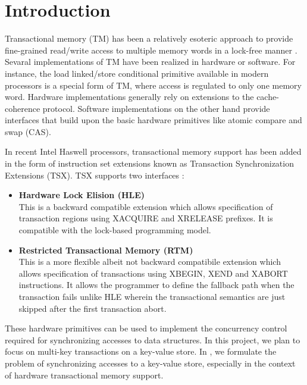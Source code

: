 \section{Introduction} \label{sec:intro}

Transactional memory (TM) has been a relatively esoteric approach to provide
fine-grained read/write access to multiple memory words in a lock-free manner
\citep{Herlihy93}. Sevaral implementations of TM have been realized in hardware
or software. For instance, the load linked/store conditional primitive available
in modern processors is a special form of TM, where access is regulated to only
one memory word. Hardware implementations generally rely on extensions to the
cache-coherence protocol. Software implementations on the other hand provide
interfaces that build upon the basic hardware primitives like atomic compare and
swap (CAS).

In recent Intel Haswell processors, transactional memory support has been added
in the form of instruction set extensions known as Transaction Synchronization
Extensions (TSX).  TSX supports two interfaces \citep{tsx-intro} : \\


\begin{itemize} 
\item \textbf{Hardware Lock Elision (HLE)} \\ This is a backward
compatible extension which allows specification of transaction regions using
XACQUIRE and XRELEASE prefixes. It is compatible with the lock-based programming
model. \\ 

\item \textbf{Restricted Transactional Memory (RTM)} \\ This is a more
flexible albeit not backward compatibile extension which allows specification of
transactions using XBEGIN, XEND and XABORT instructions. It allows the
programmer to define the fallback path when the transaction fails unlike HLE
wherein the transactional semantics are just skipped after the first transaction
abort. \\ 
\end{itemize}

These hardware primitives can be used to implement the concurrency control 
required for synchronizing accesses to data structures. In this project,
we plan to focus on multi-key transactions on a key-value store. In ,
we formulate the problem of synchronizing accesses to a key-value store, especially
in the context of hardware transactional memory support.